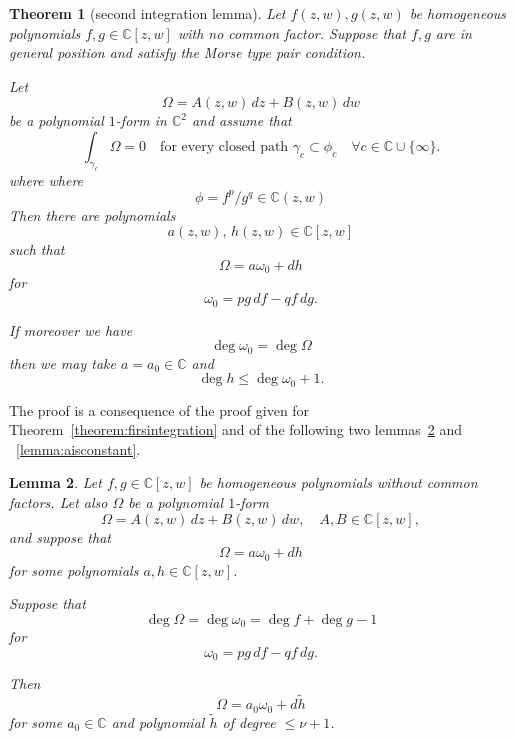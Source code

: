 \documentclass[11pt,a4paper]{amsart}
\newtheorem{theorem}{Theorem}[section]
\newtheorem{lemma}[theorem]{Lemma}
\theoremstyle{definition}
\begin{document}
\begin{theorem}[second integration lemma]
\label{theorem:secondinteglemma}
Let $f(z,w), g(z,w)$ be homogeneous polynomials
$f,g\in\mathbb{C}[z,w]$ with no common factor.
Suppose that $f,g$ are in general position
and satisfy the Morse type pair condition.

Let
\[
\Omega = A(z,w)\,dz + B(z,w)\,dw
\]
be a polynomial $1$-form in $\mathbb{C}^2$
and assume that
\begin{equation}
\label{equation:homology}
\int_{\gamma_c}\Omega = 0
\quad \text{for every closed path } \gamma_c \subset \phi_c
\quad \forall c\in\mathbb{C}\cup\{\infty\}.
\end{equation}
where where
\[
\phi=f^p/g^q \in \mathbb C(z,w)
\]
Then there are polynomials
\[
a(z,w),\, h(z,w)\in\mathbb{C}[z,w]
\]
such that
\[
\Omega = a \omega_0 + dh
\]
for
\[
\omega_0 = p g\,df - q f\,dg.
\]

If moreover we have
\[
\deg \omega_0 = \deg \Omega
\]
then we may take $a=a_0\in\mathbb{C}$
and
\[
\deg h \le \deg \omega_0 + 1.
\]
\end{theorem}

The proof is a consequence of the proof given for Theorem~\ref{theorem:firsintegration} and of the following two lemmas~\ref{lemma:normalformpolynomial} and ~\ref{lemma:aisconstant}.
\begin{lemma}
\label{lemma:normalformpolynomial}
Let $f,g\in\mathbb{C}[z,w]$ be homogeneous
polynomials without common factors.
Let also $\Omega$ be a polynomial $1$-form
\[
\Omega = A(z,w)\,dz + B(z,w)\,dw,
\quad A,B\in\mathbb{C}[z,w],
\]
and suppose that
\[
\Omega = a \omega_0 + dh
\]
for some polynomials $a,h\in\mathbb{C}[z,w]$.

Suppose that
\[
\deg\Omega=\deg \omega_0=\deg f+\deg g-1
\]
for
\[
\omega_0 = p g\,df - q f\,dg.
\]

Then
\[
\Omega = a_0 \omega_0 + d\tilde h
\]
for some $a_0\in\mathbb{C}$
and polynomial $\tilde h$ of degree $\le \nu+1$.
\end{lemma}
\end{document}
